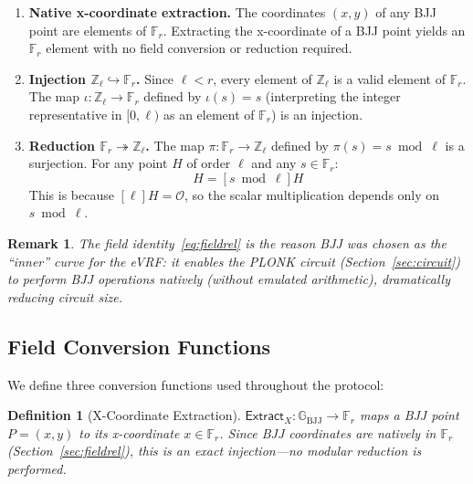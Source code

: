 \documentclass[11pt,a4paper]{article}
\newtheorem{definition}{Definition}[section]
\newtheorem{remark}{Remark}[section]
\newcommand{\F}{\mathbb{F}}
\newcommand{\Z}{\mathbb{Z}}
\newcommand{\G}{\mathbb{G}}
\newcommand{\Gbj}{\G_{\mathrm{BJJ}}}
\newcommand{\Fr}{\F_r}
\newcommand{\Fl}{\Z_\ell}
\newcommand{\Extract}{\mathsf{Extract}_X}
\begin{document}
\begin{enumerate}[nosep]
  \item \textbf{Native x-coordinate extraction.} The coordinates $(x, y)$ of
        any BJJ point are elements of $\Fr$. Extracting the x-coordinate of a
        BJJ point yields an $\Fr$ element with no field conversion or reduction
        required.

  \item \textbf{Injection $\Fl \hookrightarrow \Fr$.} Since $\ell < r$, every
        element of $\Fl$ is a valid element of $\Fr$. The map
        $\iota: \Fl \to \Fr$ defined by $\iota(s) = s$ (interpreting the
        integer representative in $[0, \ell)$ as an element of $\Fr$) is an
        injection.

  \item \textbf{Reduction $\Fr \twoheadrightarrow \Fl$.} The map
        $\pi: \Fr \to \Fl$ defined by $\pi(s) = s \bmod \ell$ is a surjection.
        For any point $H$ of order $\ell$ and any $s \in \Fr$:
        \begin{equation}
          [s]H = [s \bmod \ell]H
          \label{eq:reduction}
        \end{equation}
        This is because $[\ell]H = \mathcal{O}$, so the scalar multiplication
        depends only on $s \bmod \ell$.
\end{enumerate}

\begin{remark}
  The field identity~\eqref{eq:fieldrel} is the reason BJJ was chosen as the
  ``inner'' curve for the eVRF: it enables the PLONK circuit
  (Section~\ref{sec:circuit}) to perform BJJ operations natively (without
  emulated arithmetic), dramatically reducing circuit size.
\end{remark}

\subsection{Field Conversion Functions}
\label{sec:fieldconv}

We define three conversion functions used throughout the protocol:

\begin{definition}[X-Coordinate Extraction]
  \label{def:extractx}
  $\Extract: \Gbj \to \Fr$ maps a BJJ point $P = (x, y)$ to its x-coordinate
  $x \in \Fr$. Since BJJ coordinates are natively in $\Fr$
  (Section~\ref{sec:fieldrel}), this is an exact injection---no modular
  reduction is performed.
\end{definition}
\end{document}
